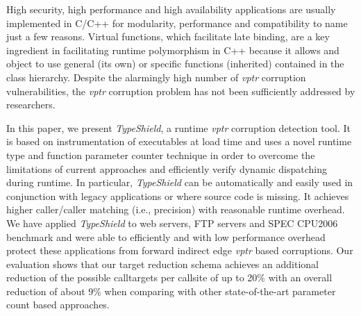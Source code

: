 High security, high performance and high availability 
applications are usually implemented in C/C++ for modularity, 
performance and compatibility to name just a few reasons.
Virtual functions, which facilitate late binding,
are a key ingredient in facilitating runtime polymorphism
in C++ because it allows and object to use general (its own) 
or specific functions (inherited) contained in the class hierarchy.
Despite the alarmingly high number of \textit{vptr} corruption
vulnerabilities, the \textit{vptr} corruption problem has not
been sufficiently addressed by researchers.


In this paper, we present \textit{TypeShield}, a runtime \textit{vptr} corruption
detection tool. It is based on instrumentation of executables at load time
and uses a novel runtime type and function parameter counter technique
in order to overcome the limitations of current approaches and efficiently
verify dynamic dispatching during runtime.
In particular, \textit{TypeShield} can be automatically and easily used
in conjunction with legacy applications or where source code is missing.
It achieves higher caller/caller matching (i.e., precision) with reasonable runtime overhead.
We have applied \textit{TypeShield} to
web servers, FTP servers and SPEC CPU2006 benchmark and were able to efficiently
and with low performance overhead protect these applications from forward indirect edge
\textit{vptr} based corruptions.
Our evaluation shows that our target reduction schema achieves an additional
reduction of the possible calltargets per callsite of up to 
20\% with an overall reduction of about 9\% when comparing with other state-of-the-art
parameter count based approaches.
